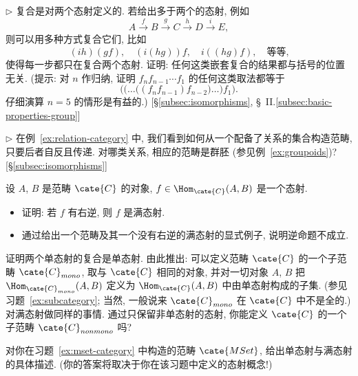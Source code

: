 \begin{prob}
\label{ex:associativity-n}
$\triangleright$ 复合是对两个态射定义的. 若给出多于两个的态射, 例如
\[
A \xrightarrow{f} B \xrightarrow{g} C \xrightarrow{h} D \xrightarrow{i} E,
\]
则可以用多种方式复合它们, 比如
\[
(ih)(gf), \quad (i(hg))f, \quad i((hg)f), \quad \text{等等,}
\]
使得每一步都只在复合两个态射. 证明: 任何这类嵌套复合的结果都与括号的位置无关. (提示: 对 $n$ 作归纳, 证明 $f_n f_{n-1} \cdots f_1$ 的任何这类取法都等于
\[
\bigl(\bigl(\dots\bigl((f_n f_{n-1}) f_{n-2}\bigr) \dots\bigr) f_1\bigr).
\]
仔细演算 $n = 5$ 的情形是有益的.) [\S\ref{subsec:isomorphisms}, \S~II.\ref{subsec:basic-properties-group}]
\end{prob}

\begin{prob}
\label{ex:groupoid-relations}
$\triangleright$ 在例~\ref{ex:relation-category} 中, 我们看到如何从一个配备了关系的集合构造范畴, 只要后者自反且传递. 对哪类关系, 相应的范畴是群胚 (参见例~\ref{ex:groupoids})? [\S\ref{subsec:isomorphisms}]
\end{prob}

\begin{prob}
\label{ex:epi-right-inverse}
设 $A$, $B$ 是范畴 $\cate{C}$ 的对象, $f \in \Hom_{\cate{C}}(A, B)$ 是一个态射.
\begin{itemize}
	\item 证明: 若 $f$ 有右逆, 则 $f$ 是满态射.
	\item 通过给出一个范畴及其一个没有右逆的满态射的显式例子, 说明逆命题不成立.
\end{itemize}
\end{prob}

\begin{prob}
\label{ex:mono-composition}
证明两个单态射的复合是单态射. 由此推出: 可以定义范畴 $\cate{C}$ 的一个子范畴 $\cate{C}_{mono}$, 取与 $\cate{C}$ 相同的对象, 并对一切对象 $A$, $B$ 把 $\Hom_{\cate{C}_{mono}}(A,B)$ 定义为 $\Hom_{\cate{C}}(A,B)$ 中由单态射构成的子集. (参见习题~\ref{ex:subcategory}; 当然, 一般说来 $\cate{C}_{mono}$ 在 $\cate{C}$ 中不是全的.) 对满态射做同样的事情. 通过只保留非单态射的态射, 你能定义 $\cate{C}$ 的一个子范畴 $\cate{C}_{nonmono}$ 吗?
\end{prob}

\begin{prob}
\label{ex:mono-epi-mset}
对你在习题~\ref{ex:mset-category} 中构造的范畴 $\cate{MSet}$, 给出单态射与满态射的具体描述. (你的答案将取决于你在该习题中定义的态射概念!)
\end{prob}

